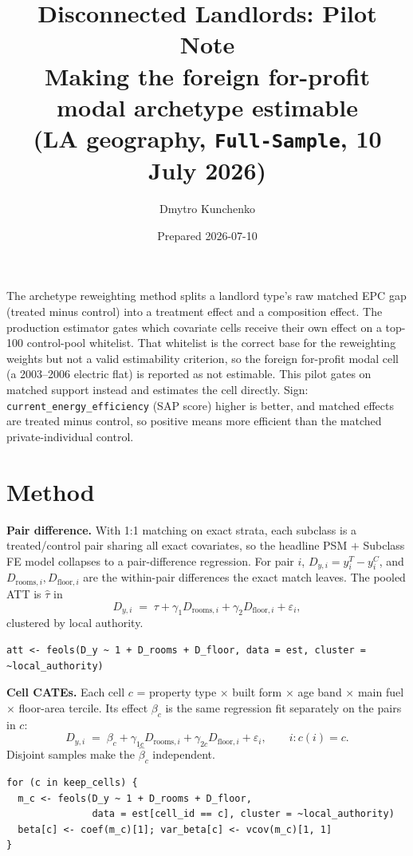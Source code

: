 \documentclass[11pt]{article}
\title{\vspace{-1.2cm}\color{dlnavy}\textbf{Disconnected Landlords: Pilot Note}\\[2pt]
\large\normalcolor Making the foreign for-profit modal archetype estimable\\[2pt]
\normalsize\normalcolor (LA geography, \texttt{Full-Sample}, 10 July 2026)}
\author{Dmytro Kunchenko}
\date{Prepared 2026-07-10}
\begin{document}
\maketitle
\vspace{-0.5cm}

\noindent The archetype reweighting method splits a landlord type's raw matched EPC gap
(treated minus control) into a treatment effect and a composition effect. The
production estimator gates which covariate cells receive their own effect on a top-100
control-pool whitelist. That whitelist is the correct base for the reweighting weights
but not a valid estimability criterion, so the foreign for-profit modal cell (a
2003--2006 electric flat) is reported as not estimable. This pilot gates on matched
support instead and estimates the cell directly. Sign: \texttt{current\_energy\_efficiency}
(SAP score) higher is better, and matched effects are treated minus control, so positive
means more efficient than the matched private-individual control.

\section{Method}

\textbf{Pair difference.} With 1:1 matching on exact strata, each subclass is a
treated/control pair sharing all exact covariates, so the headline PSM $+$ Subclass FE
model collapses to a pair-difference regression. For pair $i$, $D_{y,i}=y^{T}_i-y^{C}_i$,
and $D_{\text{rooms},i},D_{\text{floor},i}$ are the within-pair differences the exact
match leaves. The pooled ATT is $\hat\tau$ in
\[
  D_{y,i} \;=\; \tau + \gamma_1 D_{\text{rooms},i} + \gamma_2 D_{\text{floor},i} + \varepsilon_i ,
\]
clustered by local authority.
\begin{lstlisting}
att <- feols(D_y ~ 1 + D_rooms + D_floor, data = est, cluster = ~local_authority)
\end{lstlisting}

\textbf{Cell CATEs.} Each cell $c$ = property type $\times$ built form $\times$ age band
$\times$ main fuel $\times$ floor-area tercile. Its effect $\beta_c$ is the same
regression fit separately on the pairs in $c$:
\[
  D_{y,i} \;=\; \beta_c + \gamma_{1c} D_{\text{rooms},i} + \gamma_{2c} D_{\text{floor},i} + \varepsilon_i ,
  \qquad i : c(i)=c .
\]
Disjoint samples make the $\hat\beta_c$ independent.
\begin{lstlisting}
for (c in keep_cells) {
  m_c <- feols(D_y ~ 1 + D_rooms + D_floor,
               data = est[cell_id == c], cluster = ~local_authority)
  beta[c] <- coef(m_c)[1]; var_beta[c] <- vcov(m_c)[1, 1]
}
\end{lstlisting}
\end{document}
